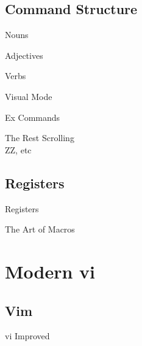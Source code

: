 \documentclass{beamer}
\begin{document}
        \subsection{Command Structure}

            \begin{frame}{Nouns}
            \end{frame}

            \begin{frame}{Adjectives}
            \pause
            \end{frame}

            \begin{frame}{Verbs}
            \end{frame}

            \begin{frame}{Visual Mode}
            \end{frame}

            \begin{frame}{Ex Commands}
            \end{frame}

            \begin{frame}{The Rest}
                Scrolling \\
                ZZ, etc
            \end{frame}

        \subsection{Registers}

            \begin{frame}{Registers}
            \end{frame}

            \begin{frame}{The Art of Macros}
            \end{frame}

    \section{Modern vi}

        \subsection{Vim}

            \begin{frame}{vi Improved}
            \end{frame}
\end{document}
